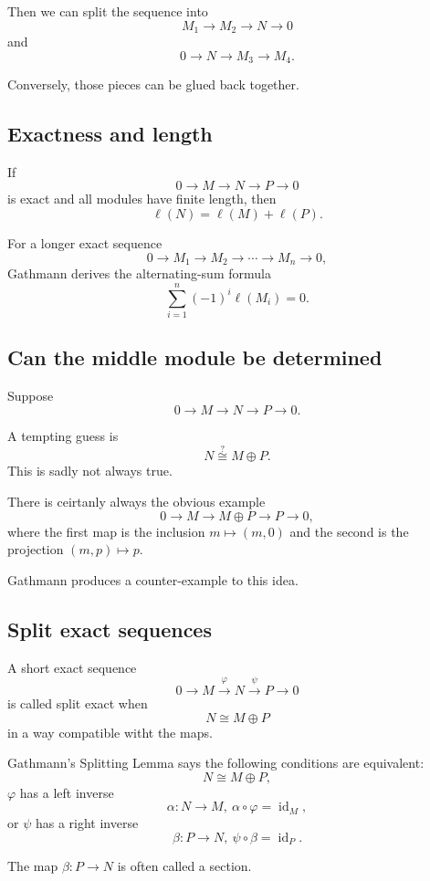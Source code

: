 \documentclass[11pt]{article}
\begin{document}
Then we can split the sequence into 
\[
    M_1 \to M_2 \to N \to 0 
\]
and 
\[
    0 \to N \to M_3 \to M_4. 
\]

Conversely, those pieces can be glued back together. 

\subsection{Exactness and length}

If 
\[
    0 \to M \to N \to P \to 0 
\]
is exact and all modules have finite length, 
then 
\[
    \ell(N) = \ell(M) + \ell(P). 
\]

For a longer exact sequence 
\[
    0 \to M_1 \to M_2 \to \cdots \to M_n \to 0, 
\]
Gathmann derives the alternating-sum formula 
\[
    \sum_{i=1}^n (-1)^i\ell(M_i) = 0. 
\]

\subsection{Can the middle module be determined}

Suppose 
\[
    0 \to M \to N \to P \to 0. 
\]

A tempting guess is 
\[
    N \overset{\text{?}}{\cong} M \oplus P. 
\]
This is sadly not always true. 

There is ceirtanly always the obvious 
example 
\[
    0 \to M \to M \oplus P \to P \to 0, 
\]
where the first map is the inclusion 
$m \mapsto (m,0)$ and the second
is the projection $(m,p) \mapsto p$. 

Gathmann produces a counter-example to 
this idea. 

\subsection{Split exact sequences}

A short exact sequence 
\[
    0 \to M \overset{\varphi}\to N \overset{\psi}\to P 
    \to 0 
\]
is called split exact when 
\[
    N \cong M \oplus P
\]
in a way compatible witht the maps. 

Gathmann's Splitting Lemma says the 
following conditions 
are equivalent: 
\[
    N \cong M \oplus P,
\]
$\varphi$ has a left inverse 
\[
    \alpha : N \to M, \ \alpha \circ \varphi = \operatorname{id}_M,
\]
or $\psi$ has a right inverse 
\[
    \beta: P \to N, \ \psi \circ \beta = \operatorname{id}_P. 
\]
 
The map $\beta : P \to N$ is often called a section. 
\end{document}
